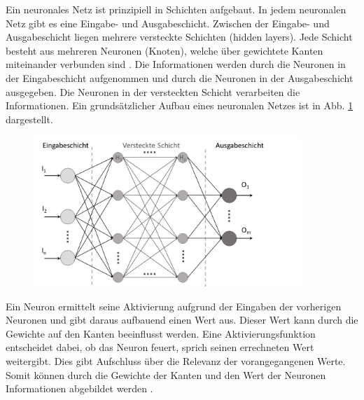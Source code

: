 Ein neuronales Netz ist prinzipiell in Schichten aufgebaut.
In jedem neuronalen Netz gibt es eine Eingabe- und Ausgabeschicht.
Zwischen der Eingabe- und Ausgabeschicht liegen mehrere versteckte Schichten (hidden layers).
Jede Schicht besteht aus mehreren Neuronen (Knoten), welche über gewichtete Kanten miteinander verbunden sind \autocite[vgl.][S. 26]{sonnet_neuronale_2022}.
Die Informationen werden durch die Neuronen in der Eingabeschicht aufgenommen und durch die Neuronen in der Ausgabeschicht ausgegeben.
Die Neuronen in der versteckten Schicht verarbeiten die Informationen.
Ein grundsätzlicher Aufbau eines neuronalen Netzes ist in Abb. \ref{fig:StructureNN} dargestellt.
\begin{figure}[H]
    \centering
    \includegraphics[width=0.9\textwidth]{images/structure_NN.png}
    \label{fig:StructureNN}
\end{figure}\noindent
Ein Neuron ermittelt seine Aktivierung aufgrund der Eingaben der vorherigen Neuronen und gibt daraus aufbauend einen Wert aus.
Dieser Wert kann durch die Gewichte auf den Kanten beeinflusst werden.
Eine Aktivierungsfunktion entscheidet dabei, ob das Neuron feuert, sprich seinen errechneten Wert weitergibt.
Dies gibt Aufschluss über die Relevanz der vorangegangenen Werte.
Somit können durch die Gewichte der Kanten und den Wert der Neuronen Informationen abgebildet werden \autocite[vgl.][S. 27]{sonnet_neuronale_2022}.

